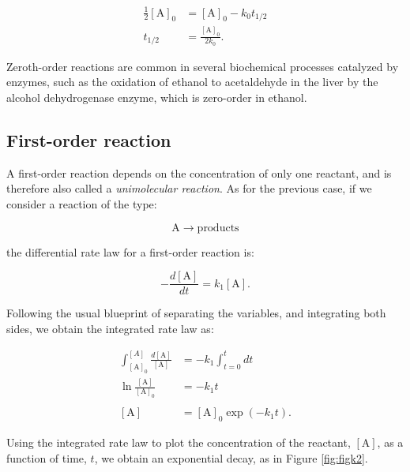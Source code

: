 \documentclass[
  9pt,
]{extbook}
\theoremstyle{definition}
\theoremstyle{definition}
\theoremstyle{definition}
\theoremstyle{remark}
\begin{document}
\begin{equation}
\begin{aligned}
\frac{1}{2}[\mathrm{A}]_0 &=[\mathrm{A}]_0 -k_0 t_{1/2} \\
t_{1/2} &= \frac{[\mathrm{A}]_0}{2k_0}.
\end{aligned}
\label{eq:kin4}
\end{equation}

Zeroth-order reactions are common in several biochemical processes catalyzed by enzymes, such as the oxidation of ethanol to acetaldehyde in the liver by the alcohol dehydrogenase enzyme, which is zero-order in ethanol.

\hypertarget{first-order-reaction}{%
\subsection{First-order reaction}\label{first-order-reaction}}

A first-order reaction depends on the concentration of only one reactant, and is therefore also called a \emph{unimolecular reaction}. As for the previous case, if we consider a reaction of the type:

\begin{equation}
\mathrm{A}\rightarrow \text{products}
\end{equation}

the differential rate law for a first-order reaction is:

\begin{equation}
- \frac{d[\mathrm{A}]}{dt}=k_1 [\mathrm{A}].
\label{eq:kin6}
\end{equation}

Following the usual blueprint of separating the variables, and integrating both sides, we obtain the integrated rate law as:

\begin{equation}
\begin{aligned}
\int_{[\mathrm{A}]_0}^{[A]} \frac{d[\mathrm{A}]}{[\mathrm{A}]} &= -k_1 \int_{t=0}^{t} dt \\
\ln \frac{[\mathrm{A}]}{[\mathrm{A}]_0}&=-k_1 t\\ \\
[\mathrm{A}] &= [\mathrm{A}]_0 \exp(-k_1 t).
\end{aligned}
\label{eq:kin7}
\end{equation}

Using the integrated rate law to plot the concentration of the reactant, \([\mathrm{A}]\), as a function of time, \(t\), we obtain an exponential decay, as in Figure \ref{fig:figk2}.
\end{document}
